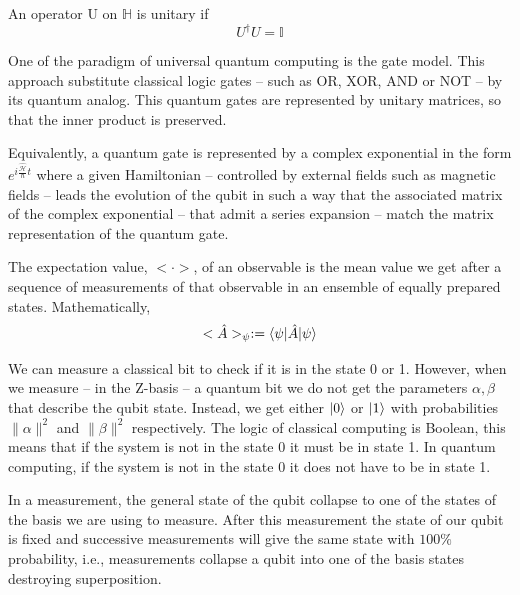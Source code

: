 \begin{definition}
    An operator U on $\mathbb{H}$ is unitary if
    \begin{equation}
        U^{\dagger}U =\mathbb{I}
    \end{equation}
\end{definition}
\begin{flushleft}
   One of the paradigm of universal quantum computing is the gate model. This approach substitute classical logic gates -- such as OR, XOR, AND or NOT -- by its quantum analog. This quantum gates are represented by unitary matrices, so that the inner product is preserved.
\end{flushleft}
\begin{flushleft}
Equivalently, a quantum gate is represented by a complex exponential in the form $e^{i\frac{\hat{\mathcal{H}}}{\hbar}t}$ where a given Hamiltonian -- controlled by external fields such as magnetic fields -- leads the evolution of the qubit in such a way that the associated matrix of the complex exponential -- that admit a series expansion -- match the matrix representation of the quantum gate.
\end{flushleft}
\begin{definition}
    The expectation value, $<\cdot>$, of an observable is the mean value we get after a sequence of measurements of that observable in an ensemble of equally prepared states.
        Mathematically,
    \begin{equation}
        <\hat{A}>_{\psi} := \braket{\psi |\hat{A}| \psi}
    \end{equation}
\end{definition}
\begin{flushleft}
We can measure a classical bit to check if it is in the state 0 or 1. However, when we measure -- in the Z-basis -- a quantum bit we do not get the parameters $\alpha, \beta$ that describe the qubit state. Instead, we get either $\ket{0}$ or $\ket{1}$ with probabilities $\|\alpha\|^{2}$ and $\|\beta\|^{2}$ respectively. The logic of classical computing is Boolean, this means that if the system is not in the state 0 it must be in state 1. In quantum computing, if the system is not in the state 0 it does not have to be in state 1.   
\end{flushleft}
In a measurement, the general state of the qubit collapse to one of the states of the basis we are using to measure. After this measurement the state of our qubit is fixed and successive measurements will give the same state with $100\%$ probability, i.e., measurements collapse a qubit into one of the basis states destroying superposition.
